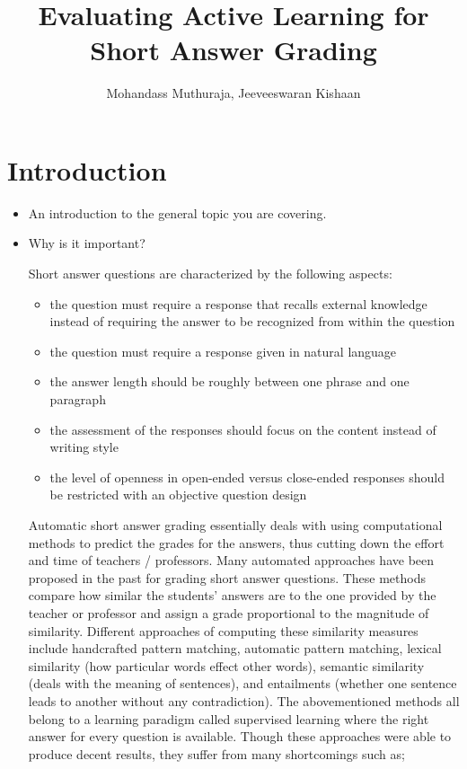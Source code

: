 \documentclass[rnd]{mas_proposal}
\title{Evaluating Active Learning for 
Short Answer Grading}
\author{Mohandass Muthuraja, Jeeveeswaran Kishaan}
\begin{document}
\maketitle

\pagestyle{plain}

\chapter{Introduction}
\begin{itemize}
    \item An introduction to the general topic you are covering.
    \item Why is it important? \\
\vspace*{1\baselineskip}

Short answer questions are characterized by the following aspects:

\begin{itemize}


\item the question must require a response that recalls external knowledge instead of requiring the answer to be recognized from within the question

\item the question must require a response given in natural language

\item the answer length should be roughly between one phrase and one paragraph

\item the assessment of the responses should focus on the content instead of writing style

\item the level of openness in open-ended versus close-ended responses should be restricted with an objective question design 

\end{itemize}

Automatic short answer grading essentially deals with using computational methods to predict the grades for the answers, thus cutting down the effort and time of teachers / professors. Many automated approaches have been proposed in the past for grading short answer questions. These methods compare how similar the students' answers are to the one provided by the teacher or professor and assign a grade proportional to the magnitude of similarity. Different approaches of computing these similarity measures include handcrafted pattern matching, automatic pattern matching, lexical similarity (how particular words effect other words), semantic similarity (deals with the meaning of sentences), and entailments (whether one sentence leads to another without any contradiction). The abovementioned methods all belong to a learning paradigm called supervised learning where the right answer for every question is available. Though these approaches were able to produce decent results, they suffer from many shortcomings such as;


\end{itemize}
\end{document}
